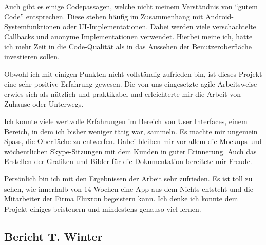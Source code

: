 Auch gibt es einige Codepassagen, welche nicht meinem Verständnis von \enquote{gutem Code} entsprechen. Diese stehen häufig im Zusammenhang mit Android-Systemfunktionen oder UI-Implementationen. Dabei werden viele verschachtelte Callbacks und anonyme Implementationen verwendet. Hierbei meine ich, hätte ich mehr Zeit in die Code-Qualität als in das Aussehen der Benutzeroberfläche investieren sollen.

Obwohl ich mit einigen Punkten nicht vollständig zufrieden bin, ist dieses Projekt eine sehr positive Erfahrung gewesen. Die von uns eingesetzte agile Arbeitsweise erwies sich als nützlich und praktikabel und erleichterte mir die Arbeit von Zuhause oder Unterwegs.

Ich konnte viele wertvolle Erfahrungen im Bereich von User Interfaces, einem Bereich, in dem ich bisher weniger tätig war, sammeln. Es machte mir ungemein Spass, die Oberfläche zu entwerfen. Dabei bleiben mir vor allem die Mockups und wöchentlichen Skype-Sitzungen mit dem Kunden in guter Erinnerung. Auch das Erstellen der Grafiken und Bilder für die Dokumentation bereitete mir Freude.

Persönlich bin ich mit den Ergebnissen der Arbeit sehr zufrieden. Es ist toll zu sehen, wie innerhalb von 14 Wochen eine App aus dem Nichts entsteht und die Mitarbeiter der Firma Fluxron begeistern kann. Ich denke ich konnte dem Projekt einiges beisteuern und mindestens genauso viel lernen.

\subsection{Bericht T. Winter}


